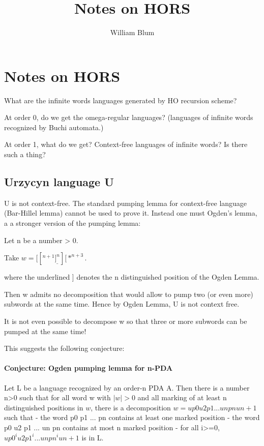 \documentclass{article}
\author{William Blum}
\title{Notes on HORS}
\begin{document}
\maketitle

\section{Notes on HORS}

What are the infinite words languages generated by HO recursion
scheme?

At order 0, do we get the omega-regular languages? (\ie languages of
infinite words  recognized by Buchi automata.)

At order 1, what do we get? Context-free languages of infinite words? Is
there such a thing?


\subsection{Urzycyn language U}

U is not context-free. The standard pumping lemma for context-free
language (Bar-Hillel lemma) cannot be used to prove it. Instead
one must Ogden's lemma, a a stronger version of the pumping lemma:

Let n be a number > 0.

Take $w = [  [^{n+1}  \underline{]^n}  ]  [  *^{n+3}.$

where the underlined ] denotes the n distinguished position of the Ogden Lemma.

Then w admits no decomposition that would allow to pump two (or even
more) subwords at the same time. Hence by Ogden Lemma, U is not
context free.

It is not even possible to decompose w so that three or more
subwords can be pumped at the same time!

This suggests the following conjecture:

\paragraph{Conjecture: Ogden pumping lemma for n-PDA}
Let L be a language recognized by an order-n PDA A.
Then there is a number n>0 such that for all word w with $|w|>0$
and all marking of at least n distinguished positions in $w$,
there is a decomposition $w = u p0  u2 p1  ...   un pn u{n+1}$ such that
- the word p0 p1 ... pn contains at least one marked position
- the word p0 u2 p1  ...  un pn contains at most n marked position
- for all i>=0, $u p0^i u2 p1^i  ...   un pn^i u{n+1}$ is in L.
\end{document}
